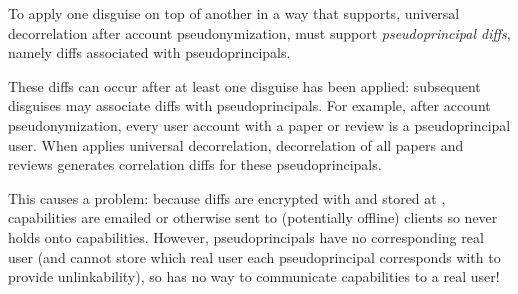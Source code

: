 To apply one disguise on top of another in a way that supports, \eg universal decorrelation after
account pseudonymization, \sys must support \emph{pseudoprincipal diffs}, namely diffs 
associated with pseudoprincipals. 

These diffs can occur after at least one disguise has been applied: subsequent disguises may
associate diffs with pseudoprincipals. For example, after account pseudonymization, every user account
 with a paper or review is a pseudoprincipal user. When \sys applies universal decorrelation,
 decorrelation of all papers and reviews generates correlation diffs for these pseudoprincipals.

This causes a problem: because diffs are encrypted with  and stored at
, capabilities are emailed or otherwise sent to (potentially offline) clients
so \sys never holds onto capabilities. However, pseudoprincipals have no corresponding real user
(and \sys cannot store which real user each pseudoprincipal corresponds with to provide
unlinkability), so \sys has no way to communicate capabilities to a real user!

